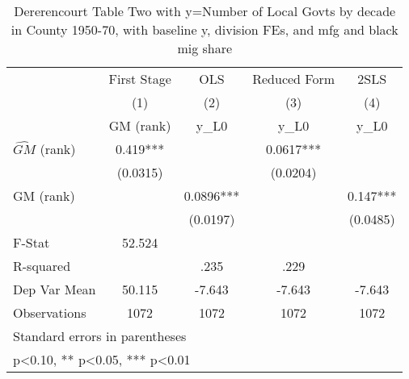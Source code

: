 \begin{table}[htbp]\centering
\def\sym#1{\ifmmode^{#1}\else\(^{#1}\)\fi}
\caption{Dererencourt Table Two with y=Number of Local Govts by decade in County 1950-70, with baseline y, division FEs, and mfg and black mig share}
\begin{tabular}{l*{4}{c}}
\toprule
                    & First Stage   &         OLS   &Reduced Form   &        2SLS   \\
                    &\multicolumn{1}{c}{(1)}&\multicolumn{1}{c}{(2)}&\multicolumn{1}{c}{(3)}&\multicolumn{1}{c}{(4)}\\
                    &\multicolumn{1}{c}{GM  (rank)}&\multicolumn{1}{c}{y\_L0}&\multicolumn{1}{c}{y\_L0}&\multicolumn{1}{c}{y\_L0}\\
\midrule
$\hat{GM}$ (rank)   &       0.419***&               &      0.0617***&               \\
                    &    (0.0315)   &               &    (0.0204)   &               \\
\addlinespace
GM  (rank)          &               &      0.0896***&               &       0.147***\\
                    &               &    (0.0197)   &               &    (0.0485)   \\
\midrule
F-Stat              &      52.524   &               &               &               \\
R-squared           &               &        .235   &        .229   &               \\
Dep Var Mean        &      50.115   &      -7.643   &      -7.643   &      -7.643   \\
Observations        &        1072   &        1072   &        1072   &        1072   \\
\bottomrule
\multicolumn{5}{l}{\footnotesize Standard errors in parentheses}\\
\multicolumn{5}{l}{\footnotesize * p<0.10, ** p<0.05, *** p<0.01}\\
\end{tabular}
\end{table}
